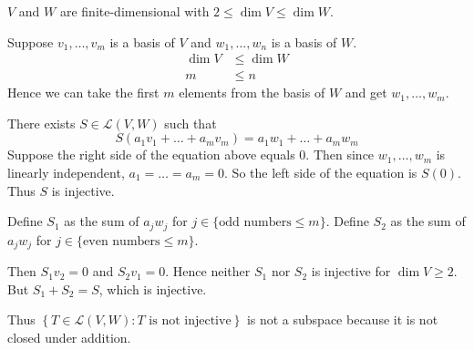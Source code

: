 \documentclass[a5paper]{article}
\begin{document}
\newcommand    \C  { \mathbf{C} }
\newcommand    \R  { \mathbf{R} }
\renewcommand  \L  { \mathcal{L} }
\newcommand    \F  { \mathbf{F} }
\newcommand    \nullspace { \text{null\;} }
\newcommand    \range     { \text{range\;} }

$V$ and $W$ are finite-dimensional with $2 \le \dim V \le \dim W$.

Suppose $v_1,\dots,v_m$ is a basis of $V$ and $w_1,\dots,w_n$ is a basis of $W$.
\begin{align*}
    \dim V &\le \dim W  \\
         m &\le n
\end{align*}
Hence we can take the first $m$ elements from the basis of $W$ and get $w_1,\dots,w_m$.

There exists $S \in \L(V,W)$ such that
\begin{equation*}
    S(a_1v_1 + \dots + a_mv_m) = a_1w_1 + \dots + a_mw_m
\end{equation*}
Suppose the right side of the equation above equals 0.
Then since $w_1,\dots,w_m$ is linearly independent, $a_1=\dots=a_m=0$.
So the left side of the equation is $S(0)$.
Thus $S$ is injective.

Define $S_1$ as the sum of $a_jw_j$ for $j \in \{\text{odd numbers}\le m\}$.
Define $S_2$ as the sum of $a_jw_j$ for $j \in \{\text{even numbers}\le m\}$.

Then $S_1v_2=0$ and $S_2v_1=0$.
Hence neither $S_1$ nor $S_2$ is injective for $\dim V\ge 2$.
But $S_1+S_2=S$, which is injective.

Thus $\left\{T \in \L(V,W) : T\text{ is not injective}\right\}$ is not a subspace because it is not closed under addition.
\end{document}
